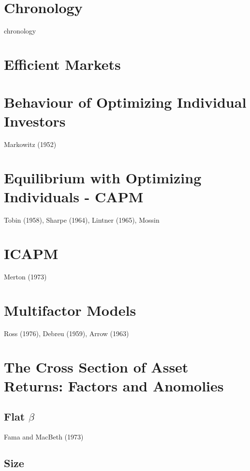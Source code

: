 \section{Chronology} \label{sec:Chronology}
{chronology}

\section{Efficient Markets}

\section[Optimizing Individuals]{Behaviour of Optimizing Individual Investors}
\label{sec:OptInd}

Markowitz (1952)\cite{markowitz1952portfolio}

\section[CAPM]{Equilibrium with Optimizing Individuals - CAPM}
\label{sec:OptEq}

Tobin (1958)\cite{tobin1958liquidity},
Sharpe (1964)\cite{sharpe1964capital},
Lintner (1965)\cite{lintner1965valuation},
Mossin

\section{ICAPM}

Merton (1973)\cite{merton1973intertemporal}

\section{Multifactor Models}

Ross (1976)\cite{ross1976arbitrage},
Debreu (1959),
Arrow (1963)

\section[Factors and Anomolies]{The Cross Section of Asset Returns: Factors
and Anomolies}

\subsection{Flat $\beta$}

Fama and MacBeth (1973)\cite{fama1973risk}

\subsection{Size}

